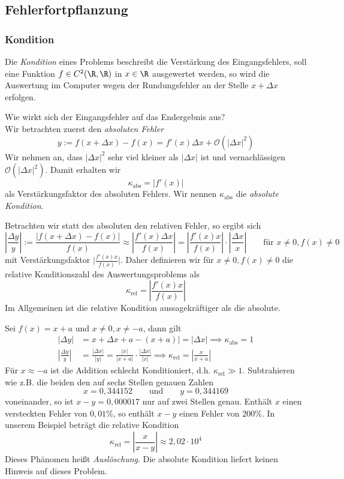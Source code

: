 \documentclass[a4paper]{scrartcl}
\numberwithin{equation}{section}
\newcommand{\kondrel}{\kappa_{\text{rel}}}
\begin{document}
\subsection{Fehlerfortpflanzung}

\subsubsection{Kondition}

Die \emph{Kondition} eines Problems beschreibt die Verstärkung des Eingangsfehlers, soll eine Funktion
$f\in C^2(\R,\R)$ in $x\in \R$ ausgewertet werden, so wird die Auswertung im Computer wegen der Rundungsfehler an der Stelle $x+\Delta x$ erfolgen.

Wie wirkt sich der Eingangsfehler auf das Endergebnis aus?\\
Wir betrachten zuerst den \emph{absoluten Fehler}
\[
y:=f(x+\Delta x)-f(x)=f'(x)\Delta x + \mathcal O(|\Delta x|^2)
\]
Wir nehmen an, dass $|\Delta x|^2$ sehr viel kleiner als $|\Delta x|$ ist und vernachlässigen $\mathcal O(|\Delta x|^2)$.
Damit erhalten wir 
\[
	\kappa_{\text{abs}}=|f'(x)|
\]
als Verstärkungsfaktor des absoluten Fehlers.
Wir nennen $\kappa_{\text{abs}}$ die \emph{absolute Kondition}.

Betrachten wir statt des absoluten den relativen Fehler, so ergibt sich
\[
\left|\frac{\Delta y}{y}\right| := \frac{|f(x+\Delta x)-f(x)|}{f(x)}\approx \left|\frac{f'(x)\Delta x}{f(x)}\right|
= \left|\frac{f'(x)x}{f(x)}\right|\cdot \left|\frac{\Delta x}{x}\right|
\qquad \text{für } x\neq 0, f(x)\neq 0
\]
mit Verstärkungsfaktor $\big|\frac{f'(x)x}{f(x)}\big|$.
Daher definieren wir für $x\neq 0, f(x)\neq0$ die relative Konditionszahl des Auswertungsproblems als
\[
\kappa_{\text{rel}}=\left|\frac{f'(x)x}{f(x)}\right|
\]
Im Allgemeinen ist die relative Kondition aussagekräftiger als die absolute.

\begin{ex}
\label{ex: 2.4}
Sei $f(x)=x+a$ und $x\neq 0, x\neq -a$, dann gilt
\begin{align*}
|\Delta y|
&=x+\Delta x+a-(x+a)|=|\Delta x| \implies \kappa_{\text{abs}}=1\\
\left|\frac {\Delta y}{y}\right|
&=\frac {|\Delta x|}{|y|}
=\frac{|x|}{|x+a|}\cdot \frac{|\Delta x|}{|x|} \implies \kondrel=\left|\frac x{x+a}\right|
\end{align*}
Für $x\approx -a$ ist die Addition schlecht Konditioniert, d.h. $\kondrel \gg 1$.
Subtrahieren wie z.B. die beiden den auf sechs Stellen genauen Zahlen
\[
x=0,344152 \qquad \text{und} \qquad y=0,344169
\]
voneinander, so ist $x-y=0,000017$ nur auf zwei Stellen genau.
Enthält $x$ einen versteckten Fehler von $0,01\%$, so enthält $x-y$ einen Fehler von
$200\%$.
In unserem Beispiel beträgt die relative Kondition
\[
\kondrel = \left|\frac x{x-y}\right| \approx 2,02 \cdot 10^4
\]
Dieses Phänomen heißt \emph{Auslöschung}.
Die absolute Kondition liefert keinen Hinweis auf dieses Problem.
\end{ex}
\end{document}
